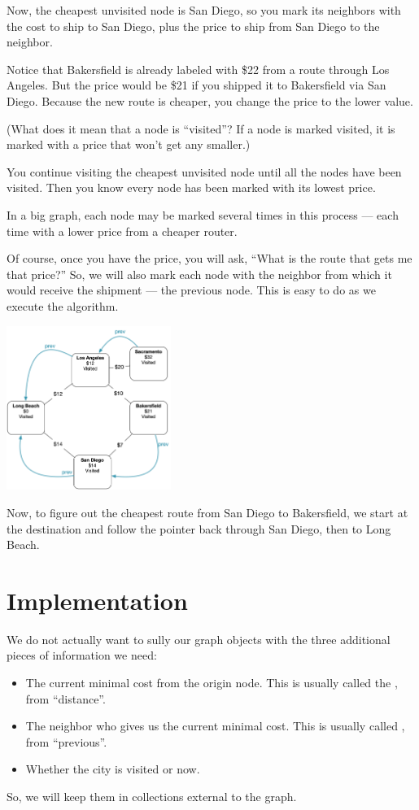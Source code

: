 Now, the cheapest unvisited node is San Diego, so you mark its
neighbors with the cost to ship to San Diego, plus the price to ship
from San Diego to the neighbor.

Notice that Bakersfield is already labeled with \$22 from a route
through Los Angeles.  But the price would be \$21 if you shipped it to
Bakersfield via San Diego.  Because the new route is cheaper, you
change the price to the lower value.

(What does it mean that a node is ``visited''?  If a node is marked
visited, it is marked with a price that won't get any smaller.)

You continue visiting the cheapest unvisited node until all the
nodes have been visited.  Then you know every node has been marked
with its lowest price.

In a big graph, each node may be marked several times in this process
--- each time with a lower price from a cheaper router.

Of course, once you have the price, you will ask, ``What is the route
that gets me that price?''  So, we will also mark each node with the
neighbor from which it would receive the shipment --- the previous
node.  This is easy to do as we execute the algorithm.

\includegraphics[width=0.4\textwidth]{prev.png}

Now, to figure out the cheapest route from San Diego to Bakersfield,
we start at the destination and follow the  pointer back
through San Diego, then to Long Beach.

\section{Implementation}

We do not actually want to sully our graph objects with the three additional pieces of information we need:
\begin{itemize}
\item The current minimal cost from the origin node. This is usually
  called the , from ``distance''.
\item The neighbor who gives us the current minimal cost. This is
  usually called , from ``previous''.
\item Whether the city is visited or now.
\end{itemize}
So, we will keep them in collections external to the graph.

